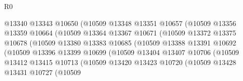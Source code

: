 \begin{lexlean}{R0}
\begin{coremodule}
                                    @13340
                                    @13343
                                    @10650
                                    (@10509
                                      @13348
                                      @13351
                                      @10657
                                      (@10509
                                        @13356
                                        @13359
                                        @10664
                                        (@10509
                                          @13364
                                          @13367
                                          @10671
                                          (@10509
                                            @13372
                                            @13375
                                            @10678
                                            (@10509
                                              @13380
                                              @13383
                                              @10685
                                              (@10509
                                                @13388
                                                @13391
                                                @10692
                                                (@10509
                                                  @13396
                                                  @13399
                                                  @10699
                                                  (@10509
                                                    @13404
                                                    @13407
                                                    @10706
                                                    (@10509
                                                      @13412
                                                      @13415
                                                      @10713
                                                      (@10509
                                                        @13420
                                                        @13423
                                                        @10720
                                                        (@10509
                                                          @13428
                                                          @13431
                                                          @10727
                                                          (@10509

\end{coremodule}
\end{lexlean}
